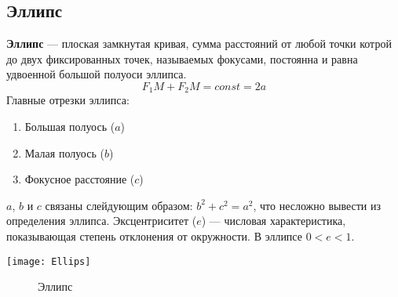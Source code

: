 \documentclass[10pt,a5paper]{article}
\begin{document}
\subsection{Эллипс}
\textbf{Эллипс} --- плоская замкнутая кривая, сумма расстояний от любой точки котрой до двух фиксированных точек, называемых фокусами, постоянна и равна удвоенной большой полуоси эллипса.
$$F_1M+F_2M=const=2a$$
Главные отрезки эллипса:
\begin{enumerate}
\item Большая полуось ($a$)
\item Малая полуось ($b$)
\item Фокусное расстояние ($c$)
\end{enumerate}
$a$, $b$ и $c$ связаны слейдующим образом: $b^2+c^2=a^2$, что несложно вывести из определения эллипса.
 Эксцентриситет ($e$) --- числовая характеристика, показывающая степень отклонения от окружности. В эллипсе $0<e<1$.
 \begin{center}
\texttt{[image: Ellips]}
\begin{figure}[h!]
\caption{Эллипс}
\end{figure}
\end{center}
\end{document}
